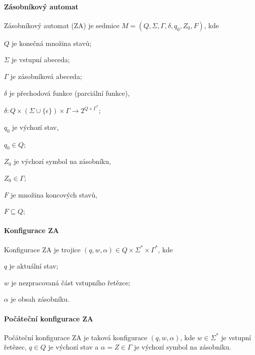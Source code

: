 \paragraph{Zásobníkový automat} Zásobníkový automat (ZA) je sedmice $M = (Q, \Sigma, \Gamma, \delta, q_0, Z_0, F)$, kde \begin{compactitem}
    \item $Q$ je konečná množina stavů;
    \item $\Sigma$ je vstupní abeceda;
    \item $\Gamma$ je zásobníková abeceda;
    \item $\delta$ je přechodová funkce (parciální funkce), \begin{compactitem}
        \item $\delta : Q \times ( \Sigma \cup \{ \epsilon \} ) \times \Gamma \rightarrow 2^{Q \times \Gamma^*}$;
    \end{compactitem}
    \item $q_0$ je výchozí stav, \begin{compactitem}
        \item $q_0 \in Q$;
    \end{compactitem}
    \item $Z_0$ je výchozí symbol na zásobníku, \begin{compactitem}
        \item $Z_0 \in \Gamma$;
    \end{compactitem}
    \item $F$ je množina koncových stavů, \begin{compactitem}
        \item $F \subseteq Q$;
    \end{compactitem}
\end{compactitem}

\paragraph{Konfigurace ZA} Konfigurace ZA je trojice $(q, w, \alpha) \in Q \times \Sigma^* \times \Gamma^*$, kde \begin{compactitem}
    \item $q$ je aktuální stav;
    \item $w$ je nezpracovaná část vstupního řetězce;
    \item $\alpha$ je obsah zásobníku.
\end{compactitem}

\paragraph{Počáteční konfigurace ZA} Počáteční konfigurace ZA je taková konfigurace $(q, w, \alpha)$, kde $w \in \Sigma^*$ je vstupní řetězec, $q \in Q$ je výchozí stav a $\alpha = Z \in \Gamma$ je výchozí symbol na zásobníku.

